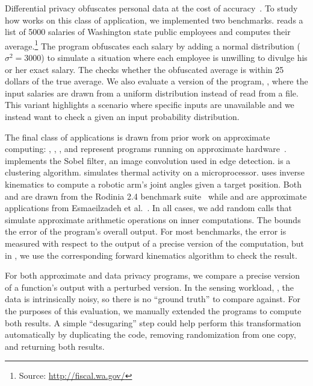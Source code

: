 Differential privacy obfuscates personal data at the cost of
accuracy~\cite{pinq, airavat, gupt, fuzz, certipriv}.
To study how \tool works on this class of application, we
implemented two benchmarks.
 reads a list of 5000 salaries of Washington state public
employees
and computes their average.\footnote{Source: \url{http://fiscal.wa.gov/}}
The program obfuscates each salary by adding a normal distribution ($\sigma^2
= 3000$) to simulate a situation where each employee is unwilling to divulge
his or her exact salary. The \passert checks whether the obfuscated average is
within 25 dollars of the true average.
We also evaluate a version of the program, , where the input
salaries are drawn from a uniform distribution instead of read from a file.
This variant highlights a scenario where specific inputs are unavailable and
we instead want to check a \passert given an input probability distribution.

The final class of applications is drawn from prior work on
approximate computing: , , , and
 represent programs
running on approximate hardware~\cite{truffle, pcmos, stochasticproc}.
 implements the Sobel filter, an image convolution used in edge
detection.
 is a clustering algorithm.
 simulates thermal activity on a microprocessor.  uses inverse kinematics to compute a robotic arm's
joint angles given a target position.
Both  and  are drawn from the Rodinia 2.4
benchmark suite~\cite{rodinia} while  and  are
approximate applications from Esmaeilzadeh et al.~\cite{npu}.
In all cases, we add random calls that
simulate approximate arithmetic operations on inner computations.
The \passert bounds the error of the program's overall output.
For most benchmarks, the error is measured with respect to the output of a
precise version of the computation, but in , we use the
corresponding forward kinematics algorithm to check the result.

For both approximate and data privacy programs, we compare a
precise version of a function's output with a perturbed version.
In the sensing workload, , the data is intrinsically noisy, so
there is no ``ground truth'' to compare against.
For the
purposes of this evaluation, we manually extended the programs to compute both
results. A simple ``desugaring'' step could help perform this transformation
automatically by duplicating the code, removing randomization from one
copy, and returning both results.

